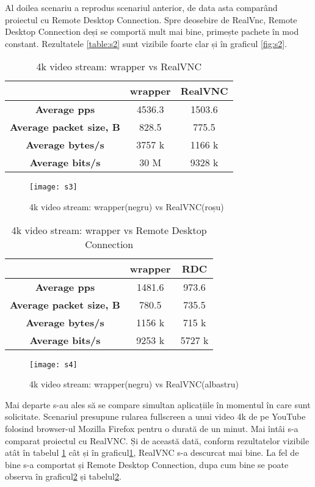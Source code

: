 Al doilea scenariu a reprodus scenariul anterior, de data asta comparând proiectul cu Remote Desktop Connection. Spre deosebire de RealVnc, Remote Desktop Connection deși se comportă mult mai bine, primește pachete în mod constant. Rezultatele \ref{table:s2} sunt vizibile foarte clar și în graficul \ref{fig:s2}.

\begin{table}[t]
\centering
\begin{tabular}{|c|c|c|}
\hline
                                & wrapper   & RealVNC   \\ \hline
\textbf{Average pps}            & 4536.3    & 1503.6    \\ \hline
\textbf{Average packet size, B} & 828.5	    & 775.5     \\ \hline
\textbf{Average bytes/s}        & 3757 k    & 1166 k	\\ \hline
\textbf{Average bits/s}         & 30 M      & 9328 k  	\\ \hline
\end{tabular}
\caption{4k video stream: wrapper vs RealVNC}
\label{table:s3}
\end{table}
\begin{figure}
    \centering
    \texttt{[image: s3]}
    \caption{4k video stream: wrapper(negru) vs RealVNC(roșu)}
    \label{fig:s3}
\end{figure}
\begin{table}[t]
\centering
\begin{tabular}{|c|c|c|}
\hline
                                & wrapper & RDC    \\ \hline
\textbf{Average pps}            & 1481.6  & 973.6  \\ \hline
\textbf{Average packet size, B} & 780.5   & 735.5  \\ \hline
\textbf{Average bytes/s}        & 1156 k  & 715 k  \\ \hline
\textbf{Average bits/s}         & 9253 k  & 5727 k \\ \hline
\end{tabular}
\caption{4k video stream: wrapper vs Remote Desktop Connection}
\label{table:s4}
\end{table}
\begin{figure}
    \centering
    \texttt{[image: s4]}
    \caption{4k video stream: wrapper(negru) vs RealVNC(albastru)}
    \label{fig:s4}
\end{figure}
Mai departe s-au ales să se compare simultan aplicațiile în momentul în care sunt solicitate. Scenariul presupune rularea fullscreen a unui video 4k de pe YouTube folosind browser-ul Mozilla Firefox pentru o durată de un minut. Mai întâi s-a comparat proiectul cu RealVNC. Și de această dată, conform rezultatelor vizibile atât în tabelul \ref{table:s3} cât și în graficul\ref{fig:s3}, RealVNC s-a descurcat mai bine. La fel de bine s-a comportat și Remote Desktop Connection, dupa cum bine se poate observa în graficul\ref{fig:s4} și tabelul\ref{table:s4}.

